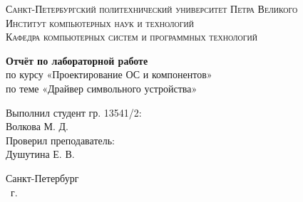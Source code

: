 \begin{titlepage}
    \centering
    \textsc{Санкт-Петербургский политехнический университет Петра Великого}\\[3mm]
    \textsc{Институт компьютерных наук и технологий}\\[3mm]
    \textsc{Кафедра компьютерных систем и программных технологий}
	
	\vfill
	
	\textbf{Отчёт по лабораторной работе }\\[3mm]
	по курсу «Проектирование ОС и компонентов»\\[3mm]
	по теме «Драйвер символьного устройства»\\[41mm]
	
    \begin{flushright}
	\begin{minipage}{.35\textwidth}
		Выполнил студент гр. 13541/2:\\
		Волкова М. Д.\\[3mm]
		Проверил преподаватель:\\
		Душутина Е. В.
	\end{minipage}
    \end{flushright}
	
	\vfill

	Санкт-Петербург\\
	\the\year\ г.
\end{titlepage}
